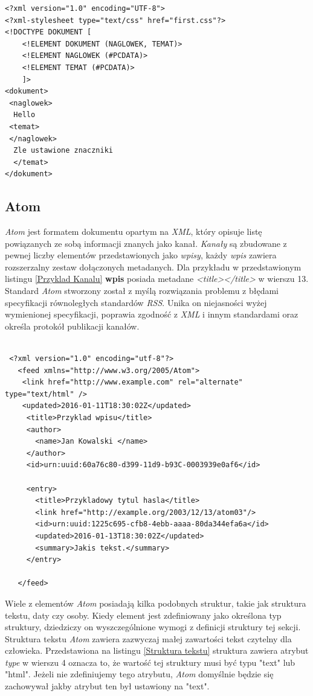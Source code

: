 \documentclass{iiuwb}
\begin{document}
\begin{lstlisting}[label=Walidacja XML, caption=Definicja typu dokumenty umieszczona w tym samym dokumencie]
<?xml version="1.0" encoding="UTF-8">
<?xml-stylesheet type="text/css" href="first.css"?>
<!DOCTYPE DOKUMENT [
	<!ELEMENT DOKUMENT (NAGLOWEK, TEMAT)>
	<!ELEMENT NAGLOWEK (#PCDATA)>
	<!ELEMENT TEMAT (#PCDATA)>
	]>
<dokument>
 <naglowek>
  Hello
 <temat>
 </naglowek>
  Zle ustawione znaczniki
  </temat>
</dokument>
\end{lstlisting}
\subsection{Atom}
\textit{Atom} \cite{Nottingam:05:Atom} jest formatem dokumentu opartym na \textit{XML}, który opisuje listę powiązanych ze sobą informacji znanych jako kanał.  \textit{Kanały} są zbudowane z pewnej liczby elementów przedstawionych jako \textit{wpisy}, każdy \textit{wpis} zawiera rozszerzalny zestaw dołączonych metadanych. Dla przykładu w przedstawionym listingu \ref{Przyklad Kanalu} \textbf{wpis} posiada metadane \textit{<title></title>} w wierszu 13.
Standard \textit{Atom} stworzony został z myślą rozwiązania problemu z błędami specyfikacji równoległych standardów \textit{RSS}. Unika on niejasności wyżej wymienionej specyfikacji, poprawia zgodność z \textit{XML} i innym standardami oraz określa protokół publikacji kanałów.
\begin{lstlisting}[label=Przyklad Kanalu, caption=Przykład wpisu w Atom]

 <?xml version="1.0" encoding="utf-8"?>
   <feed xmlns="http://www.w3.org/2005/Atom">
	<link href="http://www.example.com" rel="alternate" type="text/html" />
	<updated>2016-01-11T18:30:02Z</updated>
     <title>Przyklad wpisu</title>
     <author>
       <name>Jan Kowalski </name>
     </author>
     <id>urn:uuid:60a76c80-d399-11d9-b93C-0003939e0af6</id>

     <entry>
       <title>Przykladowy tytul hasla</title>
       <link href="http://example.org/2003/12/13/atom03"/>
       <id>urn:uuid:1225c695-cfb8-4ebb-aaaa-80da344efa6a</id>
       <updated>2016-01-13T18:30:02Z</updated>
       <summary>Jakis tekst.</summary>
     </entry>

   </feed>

\end{lstlisting}

Wiele z elementów \textit{Atom} posiadają kilka podobnych struktur, takie jak struktura tekstu, daty czy osoby. Kiedy element jest zdefiniowany jako określona typ struktury, dziedziczy on wyszczególnione wymogi z definicji struktury tej sekcji. Struktura tekstu \textit{Atom} zawiera zazwyczaj małej zawartości tekst czytelny dla człowieka. Przedstawiona na listingu \ref{Struktura tekstu} struktura zawiera atrybut \textit{type} w wierszu 4 oznacza to, że wartość tej struktury musi być typu "text" lub "html". Jeżeli nie zdefiniujemy tego atrybutu, \textit{Atom}  domyślnie będzie się zachowywał jakby atrybut ten był ustawiony na "text".
\end{document}
